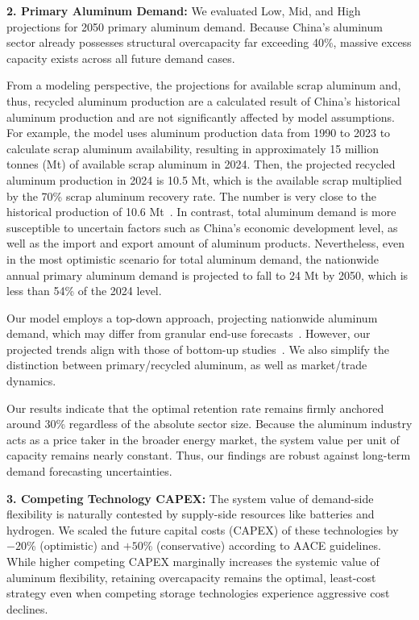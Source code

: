 \documentclass[preprint,12pt]{elsarticle}
\begin{document}
\vspace{0.3cm}
\noindent\textbf{2. Primary Aluminum Demand:} We evaluated Low, Mid, and High projections for 2050 primary aluminum demand. Because China's aluminum sector already possesses structural overcapacity far exceeding 40\%, massive excess capacity exists across all future demand cases. 

From a modeling perspective, the projections for available scrap aluminum and, thus, recycled aluminum production are a calculated result of China's historical aluminum production and are not significantly affected by model assumptions. For example, the model uses aluminum production data from 1990 to 2023 to calculate scrap aluminum availability, resulting in approximately 15 million tonnes (Mt) of available scrap aluminum in 2024. Then, the projected recycled aluminum production in 2024 is 10.5 Mt, which is the available scrap multiplied by the 70\% scrap aluminum recovery rate. The number is very close to the historical production of 10.6 Mt~\citep{ChinaNonferrous2025}. In contrast, total aluminum demand is more susceptible to uncertain factors such as China's economic development level, as well as the import and export amount of aluminum products. Nevertheless, even in the most optimistic scenario for total aluminum demand, the nationwide annual primary aluminum demand is projected to fall to 24 Mt by 2050, which is less than 54\% of the 2024 level. 

Our model employs a top-down approach, projecting nationwide aluminum demand, which may differ from granular end-use forecasts~\citep{lennon_aluminium_2022}. However, our projected trends align with those of bottom-up studies~\citep{yang_supply_2024}. We also simplify the distinction between primary/recycled aluminum, as well as market/trade dynamics.

Our results indicate that the optimal retention rate remains firmly anchored around 30\% regardless of the absolute sector size. Because the aluminum industry acts as a price taker in the broader energy market, the system value per unit of capacity remains nearly constant. Thus, our findings are robust against long-term demand forecasting uncertainties. 

\vspace{0.3cm}
\noindent\textbf{3. Competing Technology CAPEX:} The system value of demand-side flexibility is naturally contested by supply-side resources like batteries and hydrogen. We scaled the future capital costs (CAPEX) of these technologies by $-20$\% (optimistic) and $+50$\% (conservative) according to AACE guidelines. While higher competing CAPEX marginally increases the systemic value of aluminum flexibility, retaining overcapacity remains the optimal, least-cost strategy even when competing storage technologies experience aggressive cost declines. 
\end{document}
